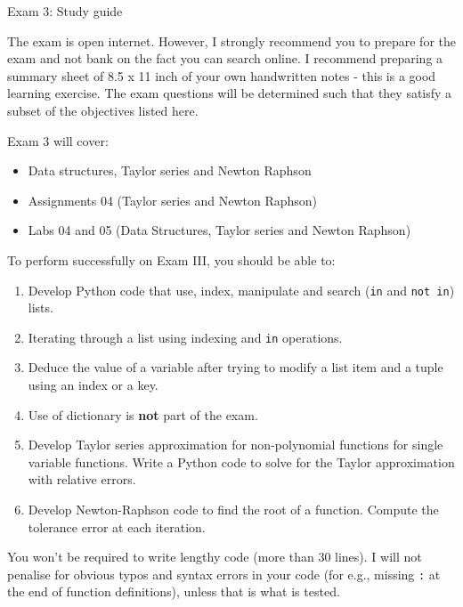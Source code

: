 \documentclass[]{article}
\begin{document}
\begin{center}
\Large Exam 3: Study guide
\end{center}

The exam is open internet. However, I strongly recommend you to prepare for the exam and not bank on the fact you can search online. I recommend preparing a summary sheet of 8.5 x 11 inch of your own handwritten notes - this is a good learning exercise. The exam questions will be determined such that they satisfy a subset of the objectives listed here.

Exam 3 will cover:
\begin{itemize}
	\item Data structures, Taylor series and Newton Raphson
	\item Assignments 04 (Taylor series and Newton Raphson)
	\item Labs 04 and 05 (Data Structures, Taylor series and Newton Raphson)
\end{itemize}

To perform successfully on Exam III, you should be able to:

\begin{enumerate}
	\item Develop Python code that use, index, manipulate and search (\verb|in| and \verb|not in|) lists.
	\item Iterating through a list using indexing and \verb|in| operations.
	\item Deduce the value of a variable after trying to modify a list item and a tuple using an index or a key.
	\item Use of dictionary is \textbf{not} part of the exam.
	\item Develop Taylor series approximation for non-polynomial functions for single variable functions. Write a Python code to solve for the Taylor approximation with relative errors.
	\item Develop Newton-Raphson code to find the root of a function. Compute the tolerance error at each iteration.

\end{enumerate}

You won't be required to write lengthy code (more than 30 lines). I will not penalise for obvious typos and syntax errors in your code (for e.g., missing \verb|:| at the end of function definitions), unless that is what is tested.
\end{document}
